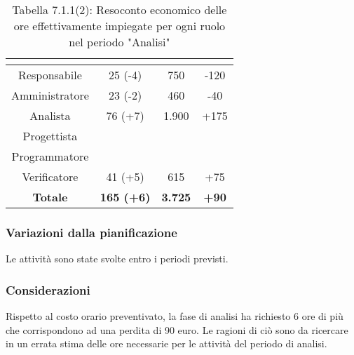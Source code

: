\renewcommand{\arraystretch}{1.4}
\begin{table}[H]
\begin{center}
\begin{tabular}{|c|c|c|c|}
\hline
\rowcolor{title_row}
\textbf{\color{title_text}{Ruolo}}  & \textbf{\color{title_text}{Ore}} & \textbf{\color{title_text}{Costo in \euro}} & \textbf{\color{title_text}{Differenza al preventivo in \euro}} \\ \hline
Responsabile    & 25 (-4) & 750 & -120 \\ \hline
Amministratore  & 23 (-2) & 460 & -40 \\ \hline
Analista        & 76 (+7) & 1.900 & +175 \\ \hline
Progettista     & & &  \\ \hline
Programmatore   & & &  \\ \hline
Verificatore    & 41 (+5) & 615 & +75  \\ \hline
\textbf{Totale} & \textbf{165 (+6)}    & \textbf{3.725} & \textbf{+90} \\ \hline
\end{tabular}
\caption{Tabella 7.1.1(2): Resoconto economico delle ore effettivamente impiegate per ogni ruolo nel periodo "Analisi"\label{}}
\end{center}
\end{table}
\renewcommand{\arraystretch}{1}


\subsubsection{Variazioni dalla pianificazione}
Le attività sono state svolte entro i periodi previsti.

\subsubsection{Considerazioni}
Rispetto al costo orario preventivato, la fase di analisi ha richiesto 6 
ore di più che corrispondono ad una perdita di 90 euro. Le ragioni di ciò sono
da ricercare in un errata stima delle ore necessarie per le attività del periodo di analisi.

\pagebreak
